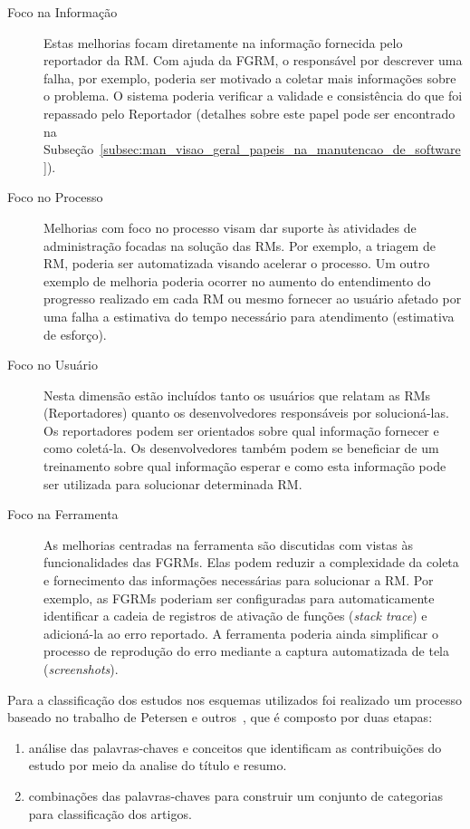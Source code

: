 \begin{description}
	\item[Foco na Informação] Estas melhorias focam diretamente na informação
		fornecida pelo reportador da RM\@. Com ajuda da FGRM, o responsável por
		descrever uma falha, por exemplo, poderia ser motivado a coletar mais
		informações sobre o problema. O sistema poderia verificar a validade e
		consistência do que foi repassado pelo Reportador (detalhes sobre este
		papel pode ser encontrado na
		Subseção~\ref{subsec:man_visao_geral_papeis_na_manutencao_de_software}).
	\item[Foco no Processo] Melhorias com foco no processo visam dar suporte às
		atividades de administração focadas na solução das RMs. Por exemplo, a
		triagem de RM, poderia ser automatizada visando acelerar o processo. Um
		outro exemplo de melhoria poderia ocorrer no aumento do entendimento do
		progresso realizado em cada RM ou mesmo fornecer ao usuário afetado por
		uma falha a estimativa do tempo necessário para atendimento (estimativa
		de esforço).
	\item[Foco no Usuário] Nesta dimensão estão incluídos tanto os usuários que
		relatam as RMs (Reportadores) quanto os desenvolvedores responsáveis por
        solucioná-las. Os reportadores podem ser orientados sobre qual
        informação fornecer e como coletá-la. Os desenvolvedores também podem se
        beneficiar de um treinamento sobre qual informação esperar e como esta
        informação pode ser utilizada para solucionar determinada RM\@.
	\item[Foco na Ferramenta] As melhorias centradas na ferramenta são
		discutidas com vistas às funcionalidades das FGRMs\@. Elas podem reduzir
		a complexidade da coleta e fornecimento das informações necessárias para
		solucionar a RM\@. Por exemplo, as FGRMs poderiam ser configuradas para
		automaticamente identificar a cadeia de registros de ativação de funções
        (\textit{stack trace}) e adicioná-la ao erro reportado. A ferramenta
        poderia ainda simplificar o processo de reprodução do erro mediante a
        captura automatizada de tela (\textit{screenshots}).
\end{description}

Para a classificação dos estudos nos esquemas utilizados foi realizado um
processo baseado no trabalho de Petersen e outros~\cite{Petersen2008}, que é
composto por duas etapas:

\begin{enumerate}[I]
	\item análise das palavras-chaves e conceitos que
		identificam as contribuições do estudo por meio da analise do título e
		resumo.
	\item combinações das palavras-chaves para construir um conjunto de
		categorias para classificação dos artigos.
\end{enumerate}

